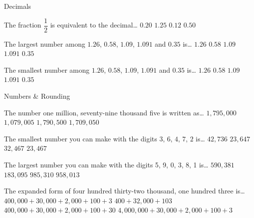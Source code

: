 \documentclass{jj_game} %
\begin{document}
\begin{Questions}
\begin{Category}{Decimals}
\begin{Question}

The fraction $\dfrac{1}{2}$ is equivalent to the
decimal\dots
{} $0.20$
 $1.25$
 $0.12$
 $0.50$
\end{Question}


\begin{Question}

The largest number among $1.26$, $0.58$, $1.09$, $1.091$ and $0.35$
is\dots
{} $1.26$
 $0.58$
 $1.09$
 $1.091$
 $0.35$
\end{Question}


\begin{Question}

The smallest number among $1.26$, $0.58$, $1.09$, $1.091$ and $0.35$
is\dots
{} $1.26$
 $0.58$
 $1.09$
 $1.091$
 $0.35$
\end{Question}

\end{Category}


\begin{Category}{Numbers \& Rounding}

\begin{Question}

The number one million, seventy-nine thousand five is written
as\dots
{} $1{,}795{,}000$
 $1{,}079{,}005$
 $1{,}790{,}500$
 $1{,}709{,}050$
\end{Question}

\begin{Question}

The smallest number you can make with the digits $3$, $6$, $4$, $7$,
$2$ is\dots
{} $42{,}736$
 $23{,}647$
 $32{,}467$
 $23{,}467$
\end{Question}

\begin{Question}

The largest number you can make with the digits 5, 9, 0, 3, 8, 1 is\dots
{} $590{,}381$
 $183{,}095$
 $985{,}310$
 $958{,}013$
\end{Question}

\begin{Question}

The expanded form of four hundred thirty-two thousand, one
hundred three is\dots
{} $400{,}000+30{,}000+2{,}000+100+3$
 $400+32{,}000+103$
 $400{,}000+30,000+2{,}000+100+30$
 $4{,}000{,}000+30{,}000+2{,}000+100+3$
\end{Question}


\end{Category}
\end{Questions}
\end{document}
